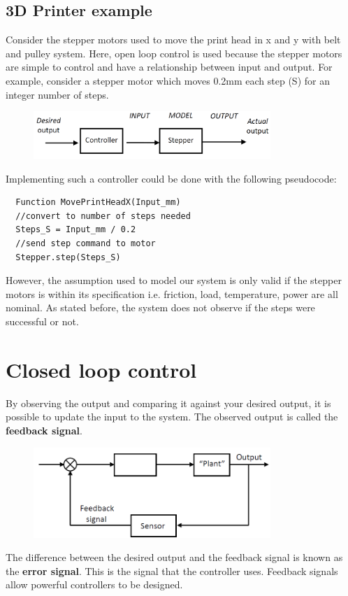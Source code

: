 \documentclass[class=report, crop=false, 12pt,a4paper]{standalone}
\begin{document}
\subsection*{3D Printer example}
Consider the stepper motors used to move the print head in x and y with belt and pulley system. Here, open loop control is used because the stepper motors are simple to control and have a relationship between input and output. For example, consider a stepper motor which moves 0.2\si{\milli\m} each step (S) for an integer number of steps. 
\begin{figure}[H]
  \centering
  \includegraphics[width = 0.8\textwidth]{../img/controlstrat3dprinter.png}
\end{figure}
Implementing such a controller could be done with the following pseudocode:
\begin{verbatim}
  Function MovePrintHeadX(Input_mm)
  //convert to number of steps needed
  Steps_S = Input_mm / 0.2
  //send step command to motor
  Stepper.step(Steps_S)
\end{verbatim}
However, the assumption used to model our system is only valid if the stepper motors is within its specification i.e. friction, load, temperature, power are all nominal. As stated before, the system does not observe if the steps were successful or not. 
\section{Closed loop control}
By observing the output and comparing it against your desired output, it is possible to update the input to the system. The observed output is called the \textbf{feedback signal}.
\begin{figure}[H]
  \centering
  \includegraphics[width = 0.8\textwidth]{../img/closedloopcontrol.png}
\end{figure}
The difference between the desired output and the feedback signal is known as the \textbf{error signal}. This is the signal that the controller uses. Feedback signals allow powerful controllers to be designed.
\end{document}
